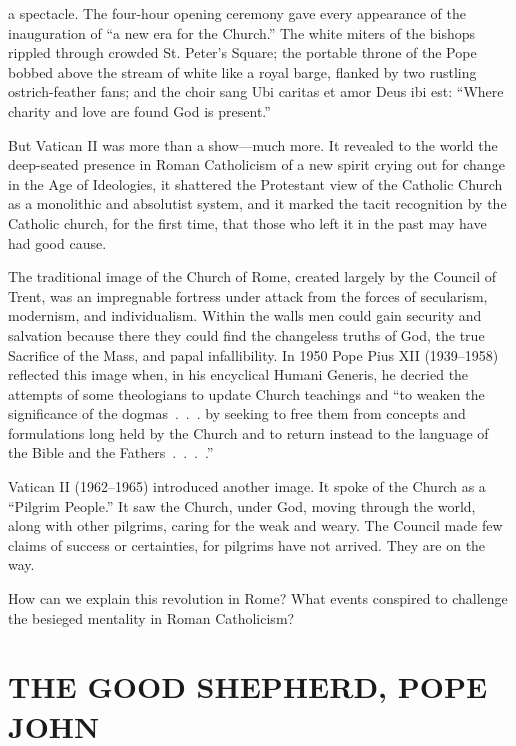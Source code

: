 
 a spectacle. The four-hour opening ceremony gave every appearance
of the inauguration of “a new era for the Church.” The white miters of the bishops rippled through
crowded St. Peter’s Square; the portable throne of the Pope bobbed above the stream of white like a
royal barge, flanked by two rustling ostrich-feather fans; and the choir sang Ubi caritas et amor
Deus ibi est: “Where charity and love are found God is present.”

But Vatican II was more than a show—much more. It revealed to the world the deep-seated presence in
Roman Catholicism of a new spirit crying out for change in the Age of Ideologies, it shattered the
Protestant view of the Catholic Church as a monolithic and absolutist system, and it marked the
tacit recognition by the Catholic church, for the first time, that those who left it in the past may
have had good cause.

The traditional image of the Church of Rome, created largely by the Council of Trent, was an
impregnable fortress under attack from the forces of secularism, modernism, and individualism.
Within the walls men could gain security and salvation because there they could find the changeless
truths of God, the true Sacrifice of the Mass, and papal infallibility. In 1950 Pope Pius XII
(1939–1958) reflected this image when, in his encyclical Humani Generis, he decried the attempts of
some theologians to update Church teachings and “to weaken the significance of the dogmas~.~.~. by
seeking to free them from concepts and formulations long held by the Church and to return instead to
the language of the Bible and the Fathers~.~.~.~.”

Vatican II (1962–1965) introduced another image. It spoke of the Church as a “Pilgrim People.” It
saw the Church, under God, moving through the world, along with other pilgrims, caring for the weak
and weary. The Council made few claims of success or certainties, for pilgrims have not arrived.
They are on the way.

How can we explain this revolution in Rome? What events conspired to challenge the besieged
mentality in Roman Catholicism?

\section{THE GOOD SHEPHERD, POPE JOHN}

